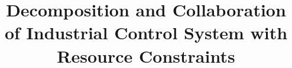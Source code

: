 \documentclass[conference]{IEEEtran}
\begin{document}

\title{Decomposition and Collaboration of Industrial Control System with Resource Constraints}




\maketitle


\IEEEpeerreviewmaketitle

\medskip

\medskip

\medskip

\medskip

\medskip

\medskip








\end{document}
